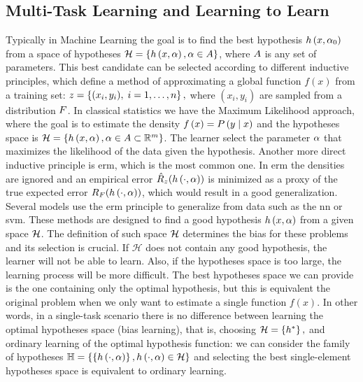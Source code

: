 \subsection{Multi-Task Learning and Learning to Learn} %
Typically in Machine Learning the goal is to find the best hypothesis $h\left(x, \alpha_0\right)$ from a space of hypotheses $\mathcal{H} = \left\{h\left(x, \alpha\right), \alpha \in A\right\}$, where $A$ is any set of parameters. This best candidate can be selected according to different inductive principles, which define a method of approximating a global function $f(x)$ from a training set:
$ z = \left\{(x_i, y_i),\; i=1, \ldots, n\right\}, $
where $(x_i, y_i)$ are sampled from a distribution $F$.
%
In classical statistics we have the Maximum Likelihood approach, where the goal is to estimate the density $f\left(x\right) = P\left( y \;\middle\vert\; x \right)$ and the hypotheses space is $\mathcal{H} = \left\{h\left(x, \alpha\right), \alpha \in A \subset \mathbb{R}^m\right\}$. The learner select the parameter $\alpha$ that maximizes the likelihood of the data given the hypothesis.
%
Another more direct inductive principle is \acrfull{erm}, which is the most common one. In \acrshort{erm} the densities are ignored and an empirical error $\hat{R}_z(h\left(\cdot, \alpha\right))$ is minimized as a proxy of the true expected error $R_F(h\left(\cdot, \alpha\right))$, which would result in a good generalization. 
%
Several models use the \acrshort{erm} principle to generalize from data such as the \acrfull{nn} or \acrfull{svm}. These methods are designed to find a good hypothesis $h\left(x, \alpha\right)$ from a given space $\mathcal{H}$. The definition of such space $\mathcal{H}$ determines the bias for these problems and its selection is crucial. If $\mathcal{H}$ does not contain any good hypothesis, the learner will not be able to learn.
Also, if the hypotheses space is too large, the learning process will be more difficult.
The best hypotheses space we can provide is the one containing only the optimal hypothesis, but this is equivalent the original problem when we only want to estimate a single function $f(x)$. In other words, in a single-task scenario there is no difference between learning the optimal hypotheses space (bias learning), that is, choosing $\mathcal{H} = \left\{h^*\right\},$ 
and ordinary learning of the optimal hypothesis function: we can consider the family of hypotheses $\mathbb{H} = \left\{\left\{h\left(\cdot, \alpha\right)\right\}, h\left(\cdot, \alpha\right) \in \mathcal{H}\right\} $ and selecting the best single-element hypotheses space is equivalent to ordinary learning.
